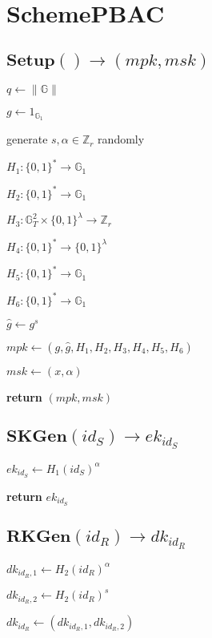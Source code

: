\documentclass[a4paper]{article}
\begin{document}
\section{SchemePBAC}

\subsection{$\textbf{Setup}() \rightarrow (\textit{mpk}, \textit{msk})$}

$q \gets \|\mathbb{G}\|$

$g \gets 1_{\mathbb{G}_1}$

generate $s, \alpha \in \mathbb{Z}_r$ randomly

$H_1: \{0, 1\}^* \rightarrow \mathbb{G}_1$

$H_2: \{0, 1\}^* \rightarrow \mathbb{G}_1$

$H_3: \mathbb{G}_T^2 \times \{0, 1\}^\lambda \rightarrow \mathbb{Z}_r$

$H_4: \{0, 1\}^* \rightarrow \{0, 1\}^\lambda$

$H_5: \{0, 1\}^* \rightarrow \mathbb{G}_1$

$H_6: \{0, 1\}^* \rightarrow \mathbb{G}_1$

$\hat{g} \gets g^s$

$ \textit{mpk} \gets (g, \hat{g}, H_1, H_2, H_3, H_4, H_5, H_6)$

$\textit{msk} \gets (x, \alpha)$

\textbf{return} $(\textit{mpk}, \textit{msk})$

\subsection{$\textbf{SKGen}(\textit{id}_S) \rightarrow \textit{ek}_{\textit{id}_S}$}

$\textit{ek}_{\textit{id}_S} \gets H_1(\textit{id}_S)^\alpha$

\textbf{return} $\textit{ek}_{\textit{id}_S}$

\subsection{$\textbf{RKGen}(\textit{id}_R) \rightarrow \textit{dk}_{\textit{id}_R}$}

$\textit{dk}_{\textit{id}_R, 1} \gets H_2(\textit{id}_R)^\alpha$

$\textit{dk}_{\textit{id}_R, 2} \gets H_2(\textit{id}_R)^s$

$\textit{dk}_{\textit{id}_R} \gets (\textit{dk}_{\textit{id}_R, 1}, \textit{dk}_{\textit{id}_R, 2})$
\end{document}
